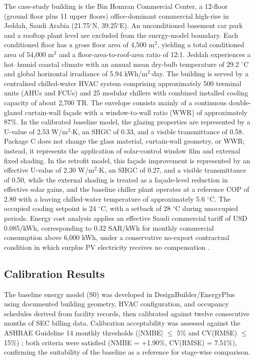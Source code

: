 \documentclass[journal,fleqn]{IEEEtran}
\begin{document}
The case-study building is the Bin Homran Commercial Center, a 12-floor (ground floor plus 11 upper floors) office-dominant commercial high-rise in Jeddah, Saudi Arabia (21.75$^{\circ}$N, 39.25$^{\circ}$E). An unconditioned basement car park and a rooftop plant level are excluded from the energy-model boundary. Each conditioned floor has a gross floor area of 4,500 m$^{2}$, yielding a total conditioned area of 54,000 m$^{2}$ and a floor-area-to-roof-area ratio of 12:1. Jeddah experiences a hot--humid coastal climate with an annual mean dry-bulb temperature of 29.2 $^{\circ}$C and global horizontal irradiance of 5.94 kWh/m$^{2}$$\cdot$day. The building is served by a centralised chilled-water HVAC system comprising approximately 500 terminal units (AHUs and FCUs) and 25 modular chillers with combined installed cooling capacity of about 2,700 TR. The envelope consists mainly of a continuous double-glazed curtain-wall façade with a window-to-wall ratio (WWR) of approximately 87\%. In the calibrated baseline model, the glazing properties are represented by a U-value of 2.53 W/m$^{2}$$\cdot$K, an SHGC of 0.33, and a visible transmittance of 0.58. Package C does not change the glass material, curtain-wall geometry, or WWR; instead, it represents the application of solar-control window film and external fixed shading. In the retrofit model, this façade improvement is represented by an effective U-value of 2.30 W/m$^{2}$$\cdot$K, an SHGC of 0.27, and a visible transmittance of 0.50, while the external shading is treated as a façade-level reduction in effective solar gains, and the baseline chiller plant operates at a reference COP of 2.80 with a leaving chilled-water temperature of approximately 5.6 $^{\circ}$C. The occupied cooling setpoint is 24 $^{\circ}$C, with a setback of 28 $^{\circ}$C during unoccupied periods. Energy cost analysis applies an effective Saudi commercial tariff of USD 0.085/kWh, corresponding to 0.32 SAR/kWh for monthly commercial consumption above 6,000 kWh, under a conservative no-export contractual condition in which surplus PV electricity receives no compensation \cite{ref26}.


\subsection{Calibration Results}

The baseline energy model (S0) was developed in DesignBuilder/EnergyPlus using documented building geometry, HVAC configuration, and occupancy schedules derived from facility records, then calibrated against twelve consecutive months of SEC billing data. Calibration acceptability was assessed against the ASHRAE Guideline 14 monthly thresholds (|NMBE| $\leq$ 5\% and CV(RMSE) $\leq$ 15\%) \cite{ref23}; both criteria were satisfied (NMBE = +1.90\%, CV(RMSE) = 7.51\%), confirming the suitability of the baseline as a reference for stage-wise comparison.
\end{document}
